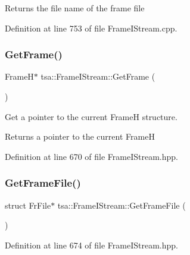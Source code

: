 \begin{DoxyReturn}{Returns}
the file name of the frame file 
\end{DoxyReturn}


Definition at line 753 of file Frame\+I\+Stream.\+cpp.

\mbox{\label{classtsa_1_1_frame_i_stream_a7719f5fb6f7adc5b96555728489b5df6}} 
\subsubsection{\texorpdfstring{Get\+Frame()}{GetFrame()}}
{\footnotesize\ttfamily FrameH$\ast$ tsa\+::\+Frame\+I\+Stream\+::\+Get\+Frame (\begin{DoxyParamCaption}{ }\end{DoxyParamCaption})\hspace{0.3cm}{\ttfamily [inline]}}

Get a pointer to the current FrameH structure.

\begin{DoxyReturn}{Returns}
a pointer to the current FrameH 
\end{DoxyReturn}


Definition at line 670 of file Frame\+I\+Stream.\+hpp.

\mbox{\label{classtsa_1_1_frame_i_stream_a9ecf2c1985bf7578f70e0bef5ac993b3}} 
\subsubsection{\texorpdfstring{Get\+Frame\+File()}{GetFrameFile()}}
{\footnotesize\ttfamily struct Fr\+File$\ast$ tsa\+::\+Frame\+I\+Stream\+::\+Get\+Frame\+File (\begin{DoxyParamCaption}{ }\end{DoxyParamCaption})\hspace{0.3cm}{\ttfamily [inline]}}



Definition at line 674 of file Frame\+I\+Stream.\+hpp.

